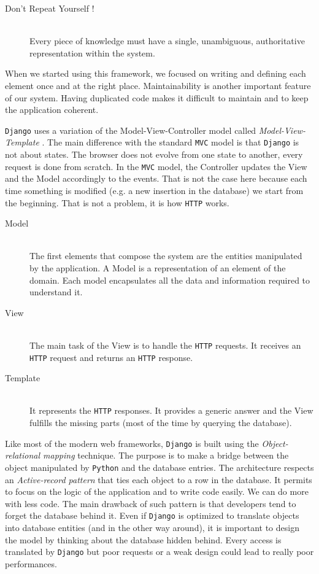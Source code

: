 \begin{description}
  \item[Don't Repeat Yourself !] \hfill \\
  Every piece of knowledge must have a single, unambiguous, authoritative representation within the system.
\end{description}

When we started using this framework, we focused on writing and defining each element once and at the right place. Maintainability is another important feature of our system. Having duplicated code makes it difficult to maintain and to keep the application coherent.

\texttt{Django} uses a variation of the Model-View-Controller model called \emph{Model-View-Template} \cite{mvt}. The main difference with the standard \texttt{MVC} model is that \texttt{Django} is not about states. The browser does not evolve from one state to another, every request is done from scratch. In the \texttt{MVC} model, the Controller updates the View and the Model accordingly to the events. That is not the case here because each time something is modified (e.g. a new insertion in the database) we start from the beginning. That is not a problem, it is how \texttt{HTTP} works.

\begin{description}
\item[Model] \hfill \\
The first elements that compose the system are the entities manipulated by the application. A Model is a representation of an element of the domain. Each model encapsulates all the data and information required to understand it.

\item[View] \hfill \\
The main task of the View is to handle the \texttt{HTTP} requests. It receives an \texttt{HTTP} request and returns an \texttt{HTTP} response.

\item[Template] \hfill \\
It represents the \texttt{HTTP} responses. It provides a generic answer and the View fulfills the missing parts (most of the time by querying the database).
\end{description}

Like most of the modern web frameworks, \texttt{Django} is built using the \emph{Object-relational mapping} technique. The purpose is to make a bridge between the object manipulated by \texttt{Python} and the database entries. The architecture respects an \emph{Active-record pattern} that ties each object to a row in the database. It permits to focus on the logic of the application and to write code easily. We can do more with less code. The main drawback of such pattern is that developers tend to forget the database behind it. Even if \texttt{Django} is optimized to translate objects into database entities (and in the other way around), it is important to design the model by thinking about the database hidden behind. Every access is translated by \texttt{Django} but poor requests or a weak design could lead to really poor performances.

